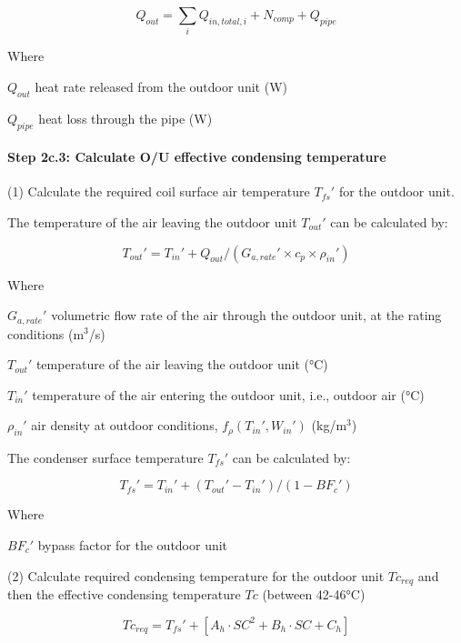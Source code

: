 \begin{equation}Q_{out}=\sum_iQ_{in,total,i}+N_{comp}+Q_{pipe}\end{equation} 

Where

$Q_{out}$	heat rate released from the outdoor unit (W)

$Q_{pipe}$ 	heat loss through the pipe (W)

\paragraph{Step 2c.3: Calculate O/U effective condensing temperature}\label{step-2c.3-calculate-ou-effective-condensing-temperature}

 (1) Calculate the required coil surface air temperature ${T_{fs}}'$ for the outdoor unit.

The temperature of the air leaving the outdoor unit ${T_{out}}'$ can be calculated by:
 
\begin{equation}{T_{out}}'={T_{in}}'+Q_{out}/({G_{a,rate}}'\times{c_p}\times{{\rho_{in}}'})\end{equation}
 
Where

${G_{a,rate}}'$ volumetric flow rate of the air through the outdoor unit, at the rating conditions (m\(^3\)/s)

${T_{out}}'$ temperature of the air leaving the outdoor unit (°C)

${T_{in}}'$	temperature of the air entering the outdoor unit, i.e., outdoor air (°C)

${\rho_{in}}'$ air density at outdoor conditions, $f_{\rho}({T_{in}}',{W_{in}}')$ (kg/m\(^3\))

The condenser surface temperature ${T_{fs}}'$ can be calculated by:
 
\begin{equation}{T_{fs}}'={T_{in}}'+({T_{out}}'-{T_{in}}')/(1-{BF_c}')\end{equation}
 
Where

${BF_c}'$ 	bypass factor for the outdoor unit  

(2) Calculate required condensing temperature for the outdoor unit $Tc_{req}$ and then the effective condensing temperature $Tc$ (between 42-46°C)
 
\begin{equation}Tc_{req}={T_{fs}}'+[A_h\cdot SC^2+B_h\cdot SC+C_h]\end{equation}

